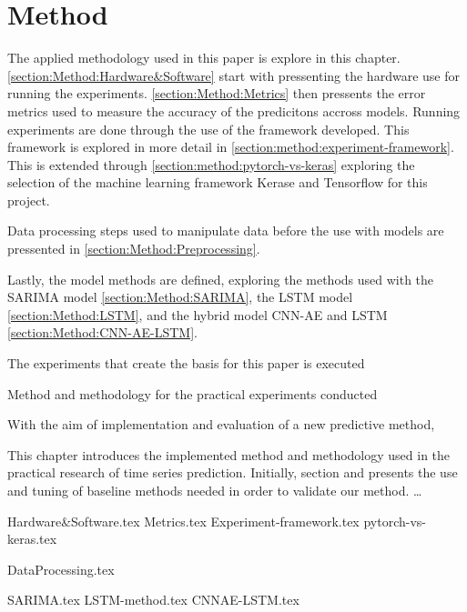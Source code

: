 \chapter{Method}
\label{section:Method}

The applied methodology used in this paper is explore in this chapter.
\cref{section:Method:Hardware&Software} start with pressenting the hardware use for running the experiments.
\cref{section:Method:Metrics} then pressents the error metrics used to measure the accuracy of the predicitons accross models.
Running experiments are done through the use of the framework developed. This framework is explored in more detail in \cref{section:method:experiment-framework}.
This is extended through \cref{section:method:pytorch-vs-keras} exploring the selection of the machine learning framework Kerase and Tensorflow for this project.

Data processing steps used to manipulate data before the use with models are pressented in \cref{section:Method:Preprocessing}.

Lastly, the model methods are defined, exploring the methods used with the SARIMA model \cref{section:Method:SARIMA}, the LSTM model \cref{section:Method:LSTM},
and the hybrid model CNN-AE and LSTM \cref{section:Method:CNN-AE-LSTM}.



The experiments that create the basis for this paper is executed 

Method and methodology for the practical experiments conducted 


With the aim of implementation and evaluation of a new predictive method,

This chapter introduces the implemented method and methodology used in the practical research of time series prediction.
Initially, section  and 
 presents the use and tuning of baseline methods needed in order to validate our method.
\dots


{Hardware&Software.tex}
{Metrics.tex}
{Experiment-framework.tex}
{pytorch-vs-keras.tex}

{DataProcessing.tex}


{SARIMA.tex}
{LSTM-method.tex}
{CNNAE-LSTM.tex}

